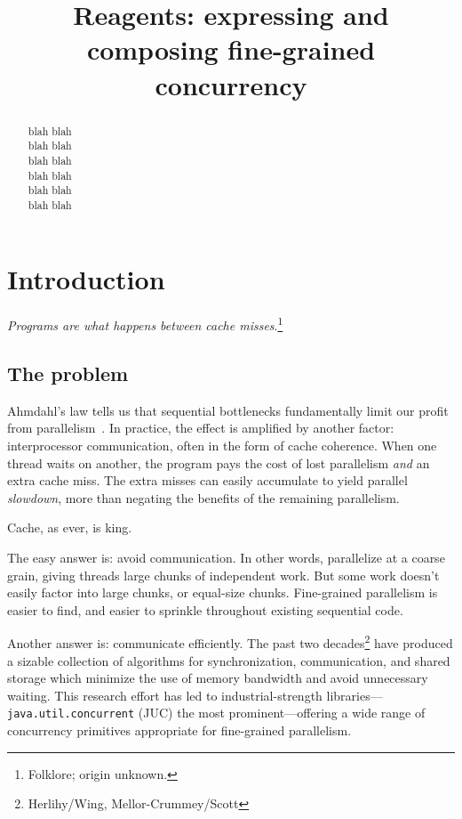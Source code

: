 \documentclass[preprint]{sigplanconf}
\begin{document}
\authorinfo{}{}{}
\title{Reagents: expressing and composing fine-grained concurrency}
\maketitle

\begin{abstract}
blah blah\\
blah blah\\
blah blah\\
blah blah\\
blah blah\\
blah blah
\end{abstract}

\section{Introduction}

\emph{Programs are what happens between cache
  misses}.\footnote{Folklore; origin unknown.}

\subsection*{The problem}

Ahmdahl's law tells us that sequential bottlenecks fundamentally limit our
profit from parallelism~\cite{?}.  In practice, the effect is amplified by
another factor: interprocessor communication, often in the form of cache
coherence.  When one thread waits on another, the program pays the cost of
lost parallelism \emph{and} an extra cache miss.  The extra misses can easily
accumulate to yield parallel \emph{slowdown}, more than negating the benefits
of the remaining parallelism.

Cache, as ever, is king.

The easy answer is: avoid communication.  In other words, parallelize at a
coarse grain, giving threads large chunks of independent work.  But some work
doesn't easily factor into large chunks, or equal-size chunks.  Fine-grained
parallelism is easier to find, and easier to sprinkle throughout existing
sequential code.

Another answer is: communicate efficiently.  The past two
decades\footnote{Herlihy/Wing, Mellor-Crummey/Scott} have produced a sizable
collection of algorithms for synchronization, communication, and shared
storage which minimize the use of memory bandwidth and avoid unnecessary
waiting.  This research effort has led to industrial-strength
libraries---\texttt{java.util.concurrent} (JUC) the most prominent---offering
a wide range of concurrency primitives appropriate for fine-grained
parallelism.
\end{document}
